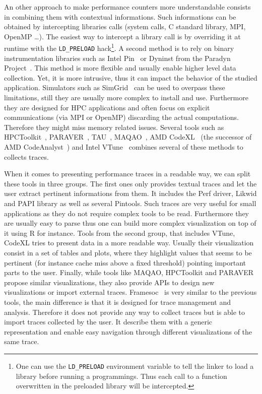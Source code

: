 An other approach to make performance counters more understandable consists in combining them with contextual informations.
Such informations can be obtained by intercepting libraries calls (system calls, C standard library, \gls{MPI}, \gls{OpenMP} \ldots).
The easiest way to intercept a library call is by overriding it at runtime with the \texttt{LD\_PRELOAD} hack\footnote{
    One can use the \texttt{LD\_PRELOAD} environment variable to tell the linker to load a library before running a programmings.
    Thus each call to a function overwritten in the preloaded library will be intercepted.}.
A second method is to rely on binary instrumentation libraries such as \gls{Intel} \gls{Pin}~\cite{Luk05Pin} or Dyninst from the Paradyn Project~\cite{Miller95Paradyn}.
This method is more flexible and usually enable higher level data collection.
Yet, it is more intrusive, thus it can impact the behavior of the studied application.
Simulators such as \gls{SimGrid}~\cite{Casanova14Versatile} can be used to overpass these limitations, still they are usually more complex to install and use.
Furthermore they are designed for \gls{HPC} applications and often focus on explicit communications (via \gls{MPI} or \gls{OpenMP}) discarding the actual computations.
Therefore they might miss memory related issues.
Several tools such as \gls{HPCToolkit}~\cite{Adhianto10HPCTOOLKIT}, \gls{PARAVER}~\cite{Pillet95PARAVER}, \gls{TAU}~\cite{Shende06Tau}, \gls{MAQAO}~\cite{Djoudi05MAQAO}, \gls{AMD} \gls{CodeXL}~\cite{AMD16CodeXL} (the successor of \gls{AMD} \gls{CodeAnalyst}~\cite{Drongowski08introduction}) and \gls{Intel} \gls{VTune}~\cite{Reinders05VTune} combines several of these methods to collects traces.

When it comes to presenting performance traces in a readable way, we can split these tools in three groups.
The first ones only provides textual traces and let the user extract pertinent informations from them.
It includes the \gls{Perf} driver, \gls{Likwid} and \gls{PAPI} library as well as several \glspl{Pintool}.
Such traces are very useful for small applications as they do not require complex tools to be read.
Furthermore they are usually easy to parse thus one can build more complex visualization on top of it using \gls{R} for instance.
Tools from the second group, that includes \gls{VTune}, \gls{CodeXL} tries to present data in a more readable way.
Usually their visualization consist in a set of tables and plots, where they highlight values that seems to be pertinent (for instance cache miss above a fixed threshold) pointing important parts to the user.
Finally, while tools like \gls{MAQAO}, \gls{HPCToolkit} and \gls{PARAVER} propose similar visualizations, they also provide \glspl{API} to design new visualizations or import external traces.
\gls{Framesoc}~\cite{Pagano13Trace,Pagano14frameSoC} is very similar to the previous tools, the main difference is that it is designed for trace management and analysis.
Therefore it does not provide any way to collect traces but is able to import traces collected by the user.
It describe them with a generic representation and enable easy navigation through different visualizations of the same trace.

